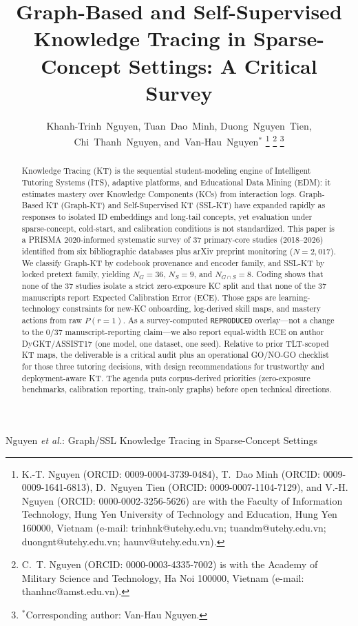 \documentclass[lettersize,journal]{IEEEtran}
\begin{document}

\title{Graph-Based and Self-Supervised Knowledge Tracing in Sparse-Concept Settings: A Critical Survey}

\author{Khanh-Trinh~Nguyen,
        Tuan~Dao~Minh,
        Duong~Nguyen~Tien,
        Chi~Thanh~Nguyen,
        and~Van-Hau~Nguyen$^{*}$%
\thanks{K.-T. Nguyen (ORCID: 0009-0004-3739-0484),
T.~Dao Minh (ORCID: 0009-0009-1641-6813),
D.~Nguyen Tien (ORCID: 0009-0007-1104-7129),
and V.-H. Nguyen (ORCID: 0000-0002-3256-5626)
are with the Faculty of Information Technology,
Hung Yen University of Technology and Education, Hung Yen 160000, Vietnam
(e-mail: trinhnk@utehy.edu.vn; tuandm@utehy.edu.vn;
duongnt@utehy.edu.vn; haunv@utehy.edu.vn).}%
\thanks{C.~T. Nguyen (ORCID: 0000-0003-4335-7002)
is with the Academy of Military Science and Technology, Ha Noi 100000, Vietnam
(e-mail: thanhnc@amst.edu.vn).}%
\thanks{$^{*}$Corresponding author: Van-Hau Nguyen.}%
}

%
{Nguyen \MakeLowercase{\textit{et al.}}: Graph/SSL Knowledge Tracing in Sparse-Concept Settings}

\maketitle

\begin{abstract}
Knowledge Tracing (KT) is the sequential student-modeling engine of Intelligent Tutoring Systems (ITS), adaptive platforms, and Educational Data Mining (EDM): it estimates mastery over Knowledge Components (KCs) from interaction logs. Graph-Based KT (Graph-KT) and Self-Supervised KT (SSL-KT) have expanded rapidly as responses to isolated ID embeddings and long-tail concepts, yet evaluation under sparse-concept, cold-start, and calibration conditions is not standardized. This paper is a PRISMA 2020-informed systematic survey of 37 primary-core studies (2018--2026) identified from six bibliographic databases plus arXiv preprint monitoring ($N = 2,017$). We classify Graph-KT by codebook provenance and encoder family, and SSL-KT by locked pretext family, yielding $N_G = 36$, $N_S = 9$, and $N_{G \cap S} = 8$. Coding shows that none of the 37 studies isolate a strict zero-exposure KC split and that none of the 37 manuscripts report Expected Calibration Error (ECE). Those gaps are learning-technology constraints for new-KC onboarding, log-derived skill maps, and mastery actions from raw $P(r=1)$. As a survey-computed \texttt{REPRODUCED} overlay---not a change to the $0/37$ manuscript-reporting claim---we also report equal-width ECE on author DyGKT/ASSIST17 (one model, one dataset, one seed). Relative to prior TLT-scoped KT maps, the deliverable is a critical audit plus an operational GO/NO-GO checklist for those three tutoring decisions, with design recommendations for trustworthy and deployment-aware KT. The agenda puts corpus-derived priorities (zero-exposure benchmarks, calibration reporting, train-only graphs) before open technical directions.
\end{abstract}
\end{document}
